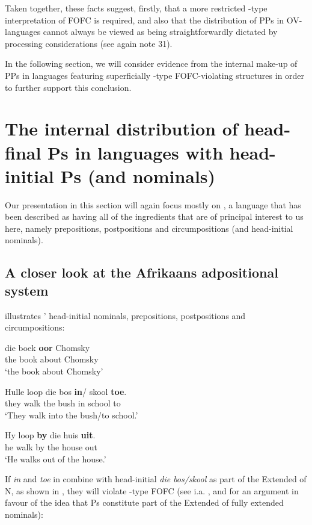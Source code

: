 \documentclass[output=paper]{LSP/langsci}
\begin{document}
Taken together, these facts suggest, firstly, that a more restricted -type interpretation of FOFC is required, and also that the distribution of PPs in OV-languages cannot always be viewed as being straightforwardly dictated by processing considerations (see again note 31).

In the following section, we will consider evidence from the internal make-up of PPs in languages featuring superficially -type FOFC-violating structures in order to further support this conclusion.

\section{The internal distribution of head-final Ps in languages with head-initial Ps (and nominals)}\label{sec:biberauer:4}

Our presentation in this section will again focus mostly on , a language that has been described as having all of the ingredients that are of principal interest to us here, namely prepositions, postpositions and circumpositions (and head-initial nominals). 

\subsection{A closer look at the Afrikaans adpositional system}

 illustrates ’ head-initial nominals, prepositions, postpositions and circumpositions:

\ea%
 \label{ex:biberauer:31}	
 \ea  \label{ex:biberauer:31a}	
       \gll die boek \textbf{oor}     Chomsky          \\
	 the book about Chomsky\\
    \glt  ‘the book about Chomsky’
  

  \ex \label{ex:biberauer:31b}	
\gll   Hulle loop die bos   \textbf{in}/ skool   \textbf{toe}.\\
     they  walk the bush in   school to\\
   \glt ‘They walk into the bush/to school.’

  \ex \label{ex:biberauer:31c}	
\gll  Hy loop \textbf{by} die huis    \textbf{uit}.\\
     he  walk by the house out\\
   \glt ‘He walks out of the house.’
\z
\z


If \textit{in} and \textit{toe} in  combine with head-initial \textit{die bos/skool} as part of the Extended  of N, as shown in , they will violate -type FOFC (see i.a. \citealt{Ledgeway2012}, and  \citealt{SheehanVanderWal2015} for an argument in favour of the idea that Ps constitute part of the Extended  of fully extended nominals): 
\end{document}
